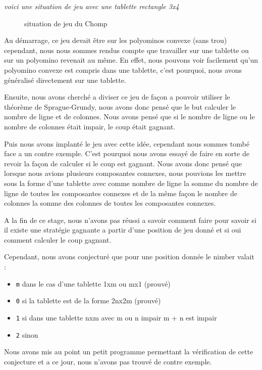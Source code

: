 \textit{
  voici une situation de jeu avec une tablette rectangle 3x4
}

\begin{figure}[h]
  \centering
  \caption{situation de jeu du Chomp}
 
\end{figure}
Au démarrage, ce jeu devait être sur les polyominos convexe (sans trou) cependant, nous nous sommes rendus compte que travailler sur une tablette ou sur un polyomino revenait au même. En effet, nous pouvons voir facilement qu'un polyomino convexe est compris dans une tablette, c'est pourquoi, nous avons généralisé directement sur une tablette.

Ensuite, nous avons cherché a diviser ce jeu de façon a pouvoir utiliser le théorème de Sprague-Grundy, nous avons donc pensé que le but calculer le nombre de ligne et de colonnes. Nous avons pensé que si le nombre de ligne ou le nombre de colonnes était impair, le coup était gagnant.

Puis nous avons implanté le jeu avec cette idée, cependant nous sommes tombé face a un contre exemple. C'est pourquoi nous avons essayé de faire en sorte de revoir la façon de calculer si le coup est gagnant. Nous avons donc pensé que lorsque nous avions plusieurs composantes connexes, nous pouvions les mettre sous la forme d'une tablette avec comme nombre de ligne la somme du nombre de ligne de toutes les composantes connexes et de la même façon le nombre de colonnes la somme des colonnes de toutes les composantes connexes.

A la fin de ce stage, nous n'avons pas réussi a savoir comment faire pour savoir si il existe une stratégie gagnante a partir d'une position de jeu donné et si oui comment calculer le coup gagnant.

Cependant, nous avons conjecturé que pour une position donnée le nimber valait :
\begin{itemize}
  \item \texttt{m} dans le cas d'une tablette 1xm ou mx1 (prouvé)
  \item \texttt{0} si la tablette est de la forme 2nx2m (prouvé)
  \item \texttt{1} si dans une tablette nxm avec m ou n impair m + n est impair
  \item \texttt{2} sinon
\end{itemize}
  Nous avons mis au point un petit programme permettant la vérification de cette conjecture et a ce jour, nous n'avons pas trouvé de contre exemple.